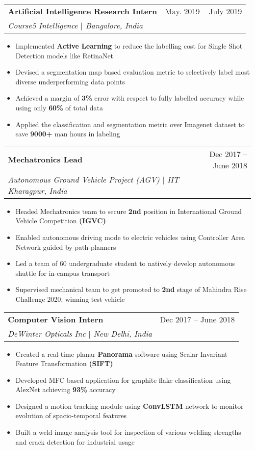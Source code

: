 \documentclass[letterpaper,11pt]{article}
\makeatletter
\newcommand{\resumeItem}[1]{
  \item\small{
    {#1 \vspace{-2pt}}
  }
}
\newcommand{\resumeSubheading}[4]{
  \vspace{-2pt}\item
    \begin{tabular*}{0.97\textwidth}[t]{l@{\extracolsep{\fill}}r}
      \textbf{#1} & #2 \\
      \textit{\small#3} & \textit{\small #4} \\
    \end{tabular*}\vspace{-7pt}
}
\newcommand{\resumeSubSubheading}[2]{
    \item
    \begin{tabular*}{0.97\textwidth}{l@{\extracolsep{\fill}}r}
      \textit{\small#1} & \textit{\small #2} \\
    \end{tabular*}\vspace{-7pt}
}
\newcommand{\resumeSubHeadingListEnd}{\end{itemize}}
\newcommand{\resumeItemListStart}{\begin{itemize}}
\newcommand{\resumeItemListEnd}{\end{itemize}\vspace{-5pt}}
\makeatother
\begin{document}

    \resumeSubheading
      {Artificial Intelligence Research Intern}{May. 2019 -- July 2019}
      {Course5 Intelligence $|$ Bangalore, India}{}
      \resumeItemListStart
        \resumeItem{Implemented \textbf{Active Learning} to reduce the labelling cost for Single Shot Detection models like RetinaNet}
        \resumeItem{Devised a segmentation map based evaluation metric to selectively label most diverse underperforming data points}
        \resumeItem{Achieved a margin of \textbf{3\%} error with respect to fully labelled accuracy while using only \textbf{60\%} of total data}
        \resumeItem{Applied the classification and segmentation metric over Imagenet dataset to save \textbf{9000+} man hours in labeling}
    \resumeItemListEnd
    
    
    \resumeSubheading
      {Mechatronics Lead}{Dec 2017 -- June 2018}
      {Autonomous Ground Vehicle Project (AGV) $|$ IIT Kharagpur, India}{}
      \resumeItemListStart
        \resumeItem{Headed Mechatronics team to secure \textbf{2nd} position in International Ground Vehicle Competition \textbf{(IGVC)}}
        \resumeItem{Enabled autonomous driving mode to electric vehicles using Controller Area Network guided by path-planners}
        \resumeItem{Led a team of 60 undergraduate student to natively develop autonomous shuttle for in-campus transport}
        \resumeItem{Supervised mechanical team to get promoted to \textbf{2nd} stage of Mahindra Rise Challenge 2020, winning test vehicle }
      \resumeItemListEnd
      

    \resumeSubheading
      {Computer Vision Intern}{Dec 2017 -- June 2018}
      {DeWinter Opticals Inc $|$ New Delhi, India}{}
      \resumeItemListStart
        \resumeItem{Created a real-time planar \textbf{Panorama} software using Scalar Invariant Feature Transformation \textbf{(SIFT)}}
        \resumeItem{Developed MFC based application for graphite flake classification using AlexNet achieving \textbf{93\%} accuracy}
        \resumeItem{Designed a motion tracking module using \textbf{ConvLSTM} network to monitor evolution of spacio-temporal features}
        \resumeItem{Built a weld image analysis tool for inspection of various welding strengths and crack detection for industrial usage}
      \resumeItemListEnd
\end{document}
